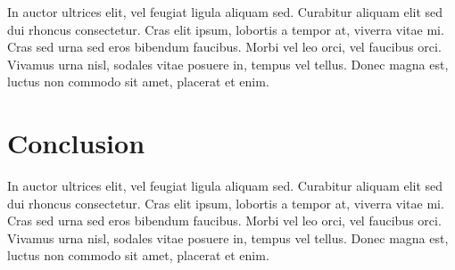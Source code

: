 \documentclass[preprint,12pt]{elsarticle}
\begin{document}
In auctor ultrices elit, vel feugiat ligula aliquam sed. Curabitur aliquam elit sed dui rhoncus consectetur. Cras elit ipsum, lobortis a tempor at, viverra vitae mi. Cras sed urna sed eros bibendum faucibus. Morbi vel leo orci, vel faucibus orci. Vivamus urna nisl, sodales vitae posuere in, tempus vel tellus. Donec magna est, luctus non commodo sit amet, placerat et enim.

\section{Conclusion}
\label{S:4}

In auctor ultrices elit, vel feugiat ligula aliquam sed. Curabitur aliquam elit sed dui rhoncus consectetur. Cras elit ipsum, lobortis a tempor at, viverra vitae mi. Cras sed urna sed eros bibendum faucibus. Morbi vel leo orci, vel faucibus orci. Vivamus urna nisl, sodales vitae posuere in, tempus vel tellus. Donec magna est, luctus non commodo sit amet, placerat et enim.













\end{document}
